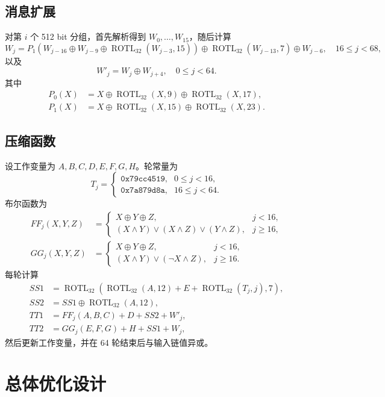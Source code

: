 \documentclass[UTF8,a4paper,12pt]{ctexart}
\newcommand{\rotl}{\operatorname{ROTL}_{32}}
\begin{document}
\subsection{消息扩展}
对第 $i$ 个 512 bit 分组，首先解析得到 $W_0,\ldots,W_{15}$，随后计算
\begin{equation}
W_j=P_1\left(W_{j-16}\oplus W_{j-9}\oplus \rotl(W_{j-3},15)\right)
\oplus \rotl(W_{j-13},7)\oplus W_{j-6},\quad 16\le j<68,
\end{equation}
以及
\begin{equation}
W'_j=W_j\oplus W_{j+4},\quad 0\le j<64.
\end{equation}
其中
\begin{align}
P_0(X)&=X\oplus \rotl(X,9)\oplus \rotl(X,17),\\
P_1(X)&=X\oplus \rotl(X,15)\oplus \rotl(X,23).
\end{align}

\subsection{压缩函数}
设工作变量为 $A,B,C,D,E,F,G,H$。轮常量为
\begin{equation}
T_j=\begin{cases}
\texttt{0x79cc4519}, & 0\le j<16,\\
\texttt{0x7a879d8a}, & 16\le j<64.
\end{cases}
\end{equation}
布尔函数为
\begin{align}
FF_j(X,Y,Z)&=\begin{cases}X\oplus Y\oplus Z,&j<16,\\(X\land Y)\lor(X\land Z)\lor(Y\land Z),&j\ge16,\end{cases}\\
GG_j(X,Y,Z)&=\begin{cases}X\oplus Y\oplus Z,&j<16,\\(X\land Y)\lor(\neg X\land Z),&j\ge16.\end{cases}
\end{align}
每轮计算
\begin{align}
SS1&=\rotl\left(\rotl(A,12)+E+\rotl(T_j,j),7\right),\\
SS2&=SS1\oplus\rotl(A,12),\\
TT1&=FF_j(A,B,C)+D+SS2+W'_j,\\
TT2&=GG_j(E,F,G)+H+SS1+W_j,
\end{align}
然后更新工作变量，并在 64 轮结束后与输入链值异或。

\section{总体优化设计}
\end{document}
